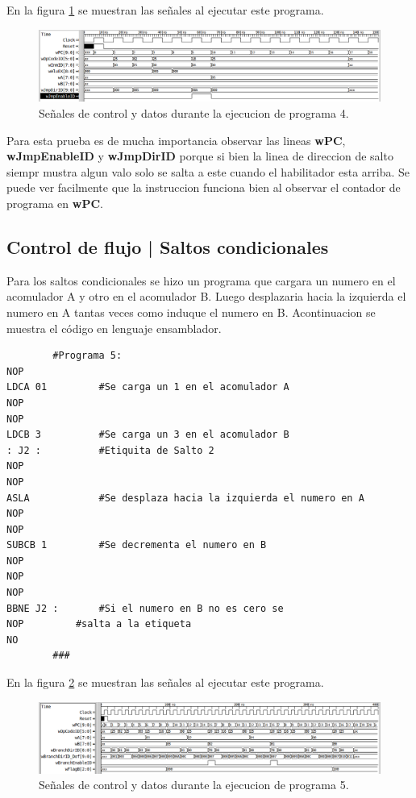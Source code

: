 \documentclass[paper=letter, fontsize=12pt]{article}
\begin{document}
En la figura \ref{i:p4} se muestran las señales al ejecutar este programa.\\

\begin{figure}[hbtp]
\centering
\includegraphics[width=1\linewidth]{../media/Prog4.png}
\caption{Señales de control y datos durante la ejecucion de programa 4.}
\label{i:p4}
\end{figure}

Para esta prueba es de mucha importancia observar las lineas \textbf{wPC}, \textbf{wJmpEnableID} y \textbf{wJmpDirID} porque si bien la linea de direccion de salto siempr mustra algun valo solo se salta a este cuando el habilitador esta arriba. Se puede ver facilmente que la instruccion funciona bien al observar el contador de programa en \textbf{wPC}.

\subsection{Control de flujo | Saltos condicionales}

Para los saltos condicionales se hizo un programa que cargara un numero en el acomulador A y otro en el acomulador B. Luego desplazaria hacia la izquierda el numero en A tantas veces como induque el numero en B. Acontinuacion se muestra el código en lenguaje ensamblador.

\begin{lstlisting}
		#Programa 5:
NOP
LDCA 01			#Se carga un 1 en el acomulador A
NOP
NOP
LDCB 3			#Se carga un 3 en el acomulador B
: J2 :			#Etiquita de Salto 2
NOP
NOP
ASLA			#Se desplaza hacia la izquierda el numero en A
NOP
NOP
SUBCB 1			#Se decrementa el numero en B
NOP
NOP
NOP
BBNE J2 :		#Si el numero en B no es cero se 
NOP			#salta a la etiqueta
NO
		###
\end{lstlisting}

En la figura \ref{i:p5} se muestran las señales al ejecutar este programa.\\

\begin{figure}[hbtp]
\centering
\includegraphics[width=1\linewidth]{../media/Prog5.png}
\caption{Señales de control y datos durante la ejecucion de programa 5.}
\label{i:p5}
\end{figure}
\end{document}
